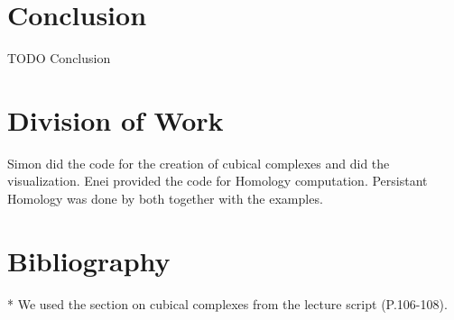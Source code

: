 \documentclass{article}
\begin{document}
    \section{Conclusion}
    TODO Conclusion

    \section{Division of Work}
    Simon did the code for the creation of cubical complexes and did the visualization.
    Enei provided the code for Homology computation.
    Persistant Homology was done by both together with the examples.

    \section{Bibliography}*
    We used the section on cubical complexes from the lecture script (P.106-108).
\end{document}
